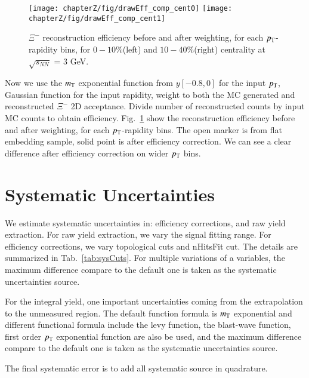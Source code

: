 \begin{figure*}[hbt!]
\texttt{[image: chapterZ/fig/drawEff\_comp\_cent0]}
\texttt{[image: chapterZ/fig/drawEff\_comp\_cent1]}
\caption{$\Xi^{-}$ reconstruction efficiency before and after weighting, for each $p_{\rm T}$-rapidity bins, for $0-10\%$(left) and $10-40\%$(right) centrality at $\sqrt{s_{NN}}$ = 3 GeV.}
\label{eff_comp}
\end{figure*}
Now we use the $m_{\rm T}$ exponential function from $y[-0.8, 0]$ for the input $p_{\rm T}$, Gaussian function for the input rapidity, weight to both the MC generated and reconstructed $\Xi^{-}$ 2D acceptance. Divide number of reconstructed counts by input MC counts to obtain efficiency. Fig.~\ref{eff_comp} show the reconstruction efficiency before and after weighting, for each $p_{\rm T}$-rapidity bins. The open marker is from flat embedding sample, solid point is after efficiency correction. We can see a clear difference after efficiency correction on wider $p_{\rm T}$ bins.

\section{Systematic Uncertainties}

We estimate systematic uncertainties in: efficiency corrections, and raw yield extraction. For raw yield extraction, we vary the signal fitting range. For efficiency corrections, we vary topological cuts and nHitsFit cut. The details are summarized in Tab.~\ref{tab:sysCuts}. For multiple variations of a variables, the maximum difference compare to the default one is taken as the systematic uncertainties source. 

For the integral yield, one important uncertainties coming from the extrapolation to the unmeasured region. The default function formula is $m_{\rm T}$ exponential and different functional formula include the levy function, the blast-wave function, first order $p_{\rm T}$ exponential function are also be used, and the maximum difference compare to the default one is taken as the systematic uncertainties source. 

The final systematic error is to add all systematic source in quadrature.

